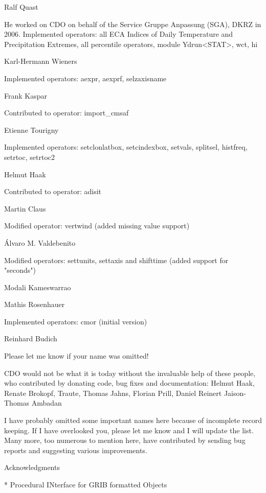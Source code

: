 Ralf Quast

He worked on CDO on behalf of the Service Gruppe Anpassung (SGA), DKRZ in 2006.
Implemented operators: all ECA Indices of Daily Temperature and
Precipitation Extremes, all percentile operators, module Ydrun<STAT>,
wct, hi

Karl-Hermann Wieners

Implemented operators: aexpr, aexprf, selzaxisname

Frank Kaspar

Contributed to operator: import_cmsaf

Etienne Tourigny

Implemented operators: setclonlatbox, setcindexbox, setvals, splitsel, histfreq, setrtoc, setrtoc2

Helmut Haak

Contributed to operator: adisit

Martin Claus

Modified operator: vertwind (added missing value support)

Álvaro M. Valdebenito

Modified operators:  settunits, settaxis and shifttime (added support for "seconds")

Modali Kameswarrao

Mathis Rosenhauer

Implemented operators: cmor (initial version)

Reinhard Budich


Please let me know if your name was omitted!

CDO would not be what it is today without the invaluable help of these people, who contributed by donating code, bug fixes and documentation:
Helmut Haak,
Renate Brokopf,
Traute, 
Thomas Jahns,
Florian Prill,
Daniel Reinert
Jaison-Thomas Ambadan

I have probably omitted some important names here because of incomplete record keeping. If I have overlooked you, please let me know and I will update the list. Many more, too numerous to mention here, have contributed by sending bug reports and suggesting various improvements.


Acknowledgments



* Procedural INterface for GRIB formatted Objects
